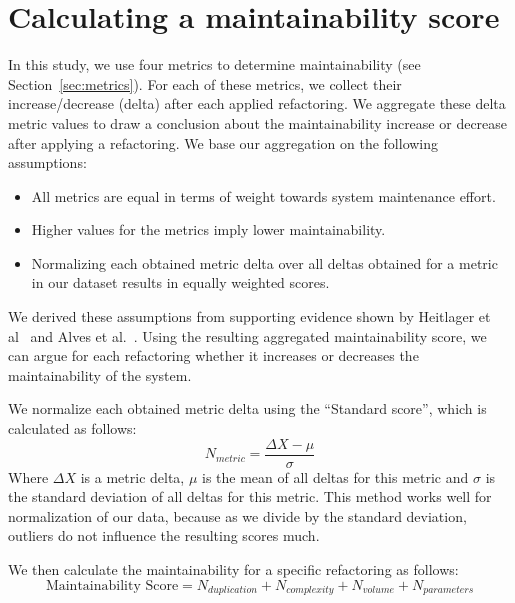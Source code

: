 \section{Calculating a maintainability score}\label{sec:metricformula}
In this study, we use four metrics to determine maintainability (see Section~\ref{sec:metrics}). For each of these metrics, we collect their increase/decrease (delta) after each applied refactoring. We aggregate these delta metric values to draw a conclusion about the maintainability increase or decrease after applying a refactoring. We base our aggregation on the following assumptions:
\begin{itemize}
  \item All metrics are equal in terms of weight towards system maintenance effort.
  \item Higher values for the metrics imply lower maintainability. %
  \item Normalizing each obtained metric delta over all deltas obtained for a metric in our dataset results in equally weighted scores.
\end{itemize}
We derived these assumptions from supporting evidence shown by Heitlager et al~\cite{heitlager2007practical} and Alves et al.~\cite{alves2010deriving}. Using the resulting aggregated maintainability score, we can argue for each refactoring whether it increases or decreases the maintainability of the system.

We normalize each obtained metric delta using the ``Standard score'', which is calculated as follows:
\begin{equation}\label{eq:scoredev}
N_{metric} = \frac {\Delta X-\mu}{\sigma}
\end{equation}
Where $\Delta X$ is a metric delta, $\mu$ is the mean of all deltas for this metric and $\sigma$ is the standard deviation of all deltas for this metric. This method works well for normalization of our data, because as we divide by the standard deviation, outliers do not influence the resulting scores much.

We then calculate the maintainability for a specific refactoring as follows:
\begin{equation}\label{eq:scoreref}
\text{Maintainability Score} = N_{duplication} + N_{complexity} + N_{volume} + N_{parameters}
\end{equation}
